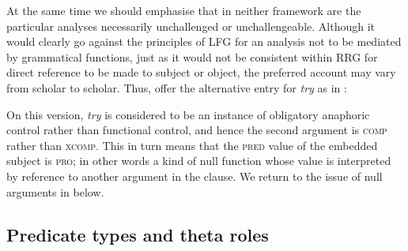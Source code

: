 \documentclass[output=paper,hidelinks]{langscibook}
\begin{document}
\ea%
   \label{ex:RRG:31}
   \ea {}
   \ex {}
   \z\z

At the same time we should emphasise that in neither framework are the particular analyses necessarily unchallenged or unchallengeable. Although it would clearly go against the principles of LFG for an analysis not to be mediated by grammatical functions, just as it would not be consistent within RRG for direct reference to be made to subject or object, the preferred account may vary from scholar to scholar. Thus, \citet[561-566]{DLM:LFG} offer the alternative entry for \textit{try} as in :

\ea%
   \label{ex:RRG:32}
   \z

\noindent On this version, \textit{try} is considered to be an instance of obligatory anaphoric control rather than functional control, and hence the second argument is \textsc{comp} rather than \textsc{xcomp.} This in turn means that the \textsc{pred} value of the embedded subject is \textsc{pro;} in other words a kind of null function whose value is interpreted by reference to another argument in the clause. We return to the issue of null arguments in  below.

\subsection{Predicate types and theta roles}
\label{sec:RRG:3.2}
\end{document}
